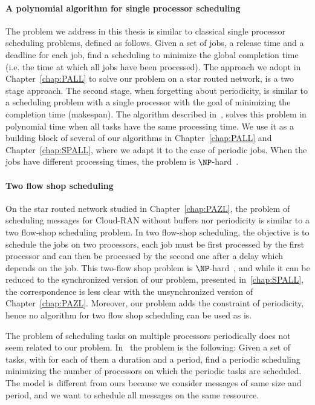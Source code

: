 \paragraph{A polynomial algorithm for single processor scheduling}
The problem we address in this thesis is similar to classical single processor scheduling problems, defined as follows. Given a set of jobs, a release time and a deadline for each job, find a scheduling to minimize the global completion time (i.e. the time at which all jobs have been processed).
The approach we adopt in Chapter~\ref{chap:PALL} to solve our problem on a star routed network, is a two stage approach. The second stage, when forgetting about periodicity, is similar to a scheduling problem with a single processor with the goal of minimizing the completion time (makespan). The algorithm described in~\cite{simons1978fast}, solves this problem in polynomial time when all tasks have the same processing time. We use it as a building block of several of our algorithms in Chapter~\ref{chap:PALL} and Chapter~\ref{chap:SPALL}, where we adapt it to the case of periodic jobs. When the jobs have different processing times, the problem is $\NP$-hard~\cite{lenstra1977complexity}.

\paragraph{Two flow shop scheduling}
 On the star routed network studied in Chapter~\ref{chap:PAZL}, the problem of scheduling messages for Cloud-RAN without buffers nor periodicity is similar to a two flow-shop scheduling problem. In two flow-shop scheduling, the objective is to schedule the jobs on two processors, each job must be first processed by the first processor and can then be processed by the second one after a delay which depends on the job. This two-flow shop problem is $\NP$-hard~\cite{yu2004minimizing}, and while it can be reduced to the synchronized version of our problem, presented in~\ref{chap:SPALL}, the correspondence is less clear with the unsynchronized version of Chapter~\ref{chap:PAZL}. Moreover, our problem adds the constraint of periodicity, hence no algorithm for two flow shop scheduling can be used as is.

The problem of scheduling tasks on multiple processors periodically does not seem related to our problem. In~\cite{korst1991periodic} the problem is the following: Given a set of tasks, with for each of them a duration and a period, find a periodic scheduling minimizing the number of processors on which the periodic tasks are scheduled. The model is different from ours because we consider messages of same size and period, and we want to schedule all messages on the same ressource.

